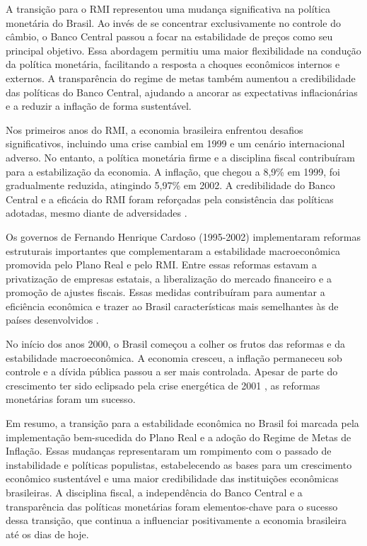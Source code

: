 \documentclass[12pt,oneside,a4paper,chapter=TITLE,english,brazil,sumario=abnt-6027-2012]{abntex2}
\begin{document}
A transição para o RMI representou uma mudança significativa na política monetária do Brasil. Ao invés de se concentrar exclusivamente no controle do câmbio, o Banco Central passou a focar na estabilidade de preços como seu principal objetivo. Essa abordagem permitiu uma maior flexibilidade na condução da política monetária, facilitando a resposta a choques econômicos internos e externos. A transparência do regime de metas também aumentou a credibilidade das políticas do Banco Central, ajudando a ancorar as expectativas inflacionárias e a reduzir a inflação de forma sustentável.

Nos primeiros anos do RMI, a economia brasileira enfrentou desafios significativos, incluindo uma crise cambial em 1999 e um cenário internacional adverso. No entanto, a política monetária firme e a disciplina fiscal contribuíram para a estabilização da economia. A inflação, que chegou a 8,9\% em 1999, foi gradualmente reduzida, atingindo 5,97\% em 2002. A credibilidade do Banco Central e a eficácia do RMI foram reforçadas pela consistência das políticas adotadas, mesmo diante de adversidades \cite{fabiogiambiagi_1999_a}.

Os governos de Fernando Henrique Cardoso (1995-2002) implementaram reformas estruturais importantes que complementaram a estabilidade macroeconômica promovida pelo Plano Real e pelo RMI. Entre essas reformas estavam a privatização de empresas estatais, a liberalização do mercado financeiro e a promoção de ajustes fiscais. Essas medidas contribuíram para aumentar a eficiência econômica e trazer ao Brasil características mais semelhantes às de países desenvolvidos \cite{fabiogiambiagi_2016_economia}.

No início dos anos 2000, o Brasil começou a colher os frutos das reformas e da estabilidade macroeconômica. A economia cresceu, a inflação permaneceu sob controle e a dívida pública passou a ser mais controlada. Apesar de parte do crescimento ter sido eclipsado pela crise energética de 2001 \cite{fabiogiambiagi_2016_economia}, as reformas monetárias foram um sucesso.

Em resumo, a transição para a estabilidade econômica no Brasil foi marcada pela implementação bem-sucedida do Plano Real e a adoção do Regime de Metas de Inflação. Essas mudanças representaram um rompimento com o passado de instabilidade e políticas populistas, estabelecendo as bases para um crescimento econômico sustentável e uma maior credibilidade das instituições econômicas brasileiras. A disciplina fiscal, a independência do Banco Central e a transparência das políticas monetárias foram elementos-chave para o sucesso dessa transição, que continua a influenciar positivamente a economia brasileira até os dias de hoje.
\end{document}
